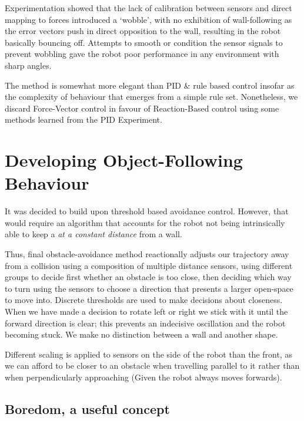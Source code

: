 \documentclass[11pt, a4paper]{article}
\begin{document}
Experimentation showed that the lack of calibration between sensors and 
direct mapping to forces introduced a `wobble', with no exhibition of 
wall-following as the error vectors push in direct opposition to the wall, 
resulting in the robot basically bouncing off. Attempts to smooth or condition the 
sensor signals to prevent wobbling gave the robot poor performance in any environment 
with sharp angles.

The method is somewhat more elegant than PID \& rule based control insofar 
as the complexity of behaviour that emerges from a simple rule set. Nonetheless, we 
discard Force-Vector control in favour of Reaction-Based control using some methods 
learned from the PID Experiment.



\section{Developing Object-Following Behaviour}

It was decided to build upon threshold based avoidance control. However, 
that would require an algorithm that accounts for the robot not being intrinsically
able to keep a  \emph{at a constant distance} from a wall.

Thus, final obstacle-avoidance method reactionally adjusts our trajectory away from a 
collision using a composition of multiple distance sensors, using different groups to 
decide first whether an obstacle is too close, then deciding which way to turn using 
the sensors to choose a direction that presents a larger open-space to move into.
Discrete thresholds are used to make decisions about closeness. When we have made a 
decision to rotate left or right we stick with it until the forward direction is clear; 
this prevents an indecisive oscillation and the robot becoming stuck. We make no 
distinction between a wall and another shape.

Different scaling is applied to sensors on the side of the robot than the front, as we 
can afford to be closer to an obstacle when travelling parallel to it rather than 
when perpendicularly approaching (Given the robot always moves forwards).

\subsection{Boredom, a useful concept}
\end{document}
